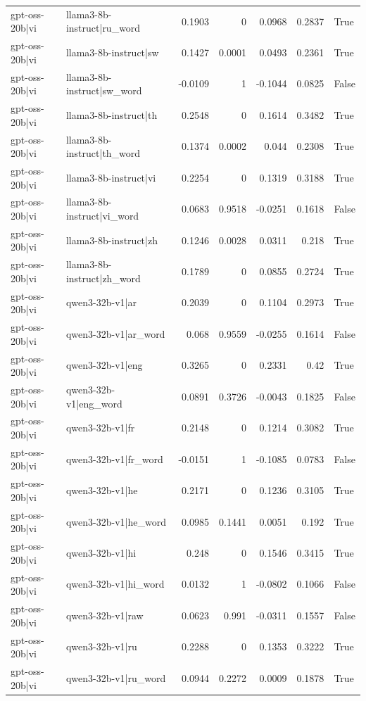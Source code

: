\begin{table}
\begin{tabular}{l l r r r r l}
gpt-oss-20b|vi & llama3-8b-instruct|ru_word & 0.1903 & 0 & 0.0968 & 0.2837 & True \\
gpt-oss-20b|vi & llama3-8b-instruct|sw & 0.1427 & 0.0001 & 0.0493 & 0.2361 & True \\
gpt-oss-20b|vi & llama3-8b-instruct|sw_word & -0.0109 & 1 & -0.1044 & 0.0825 & False \\
gpt-oss-20b|vi & llama3-8b-instruct|th & 0.2548 & 0 & 0.1614 & 0.3482 & True \\
gpt-oss-20b|vi & llama3-8b-instruct|th_word & 0.1374 & 0.0002 & 0.044 & 0.2308 & True \\
gpt-oss-20b|vi & llama3-8b-instruct|vi & 0.2254 & 0 & 0.1319 & 0.3188 & True \\
gpt-oss-20b|vi & llama3-8b-instruct|vi_word & 0.0683 & 0.9518 & -0.0251 & 0.1618 & False \\
gpt-oss-20b|vi & llama3-8b-instruct|zh & 0.1246 & 0.0028 & 0.0311 & 0.218 & True \\
gpt-oss-20b|vi & llama3-8b-instruct|zh_word & 0.1789 & 0 & 0.0855 & 0.2724 & True \\
gpt-oss-20b|vi & qwen3-32b-v1|ar & 0.2039 & 0 & 0.1104 & 0.2973 & True \\
gpt-oss-20b|vi & qwen3-32b-v1|ar_word & 0.068 & 0.9559 & -0.0255 & 0.1614 & False \\
gpt-oss-20b|vi & qwen3-32b-v1|eng & 0.3265 & 0 & 0.2331 & 0.42 & True \\
gpt-oss-20b|vi & qwen3-32b-v1|eng_word & 0.0891 & 0.3726 & -0.0043 & 0.1825 & False \\
gpt-oss-20b|vi & qwen3-32b-v1|fr & 0.2148 & 0 & 0.1214 & 0.3082 & True \\
gpt-oss-20b|vi & qwen3-32b-v1|fr_word & -0.0151 & 1 & -0.1085 & 0.0783 & False \\
gpt-oss-20b|vi & qwen3-32b-v1|he & 0.2171 & 0 & 0.1236 & 0.3105 & True \\
gpt-oss-20b|vi & qwen3-32b-v1|he_word & 0.0985 & 0.1441 & 0.0051 & 0.192 & True \\
gpt-oss-20b|vi & qwen3-32b-v1|hi & 0.248 & 0 & 0.1546 & 0.3415 & True \\
gpt-oss-20b|vi & qwen3-32b-v1|hi_word & 0.0132 & 1 & -0.0802 & 0.1066 & False \\
gpt-oss-20b|vi & qwen3-32b-v1|raw & 0.0623 & 0.991 & -0.0311 & 0.1557 & False \\
gpt-oss-20b|vi & qwen3-32b-v1|ru & 0.2288 & 0 & 0.1353 & 0.3222 & True \\
gpt-oss-20b|vi & qwen3-32b-v1|ru_word & 0.0944 & 0.2272 & 0.0009 & 0.1878 & True \\

\end{tabular}
\end{table}
